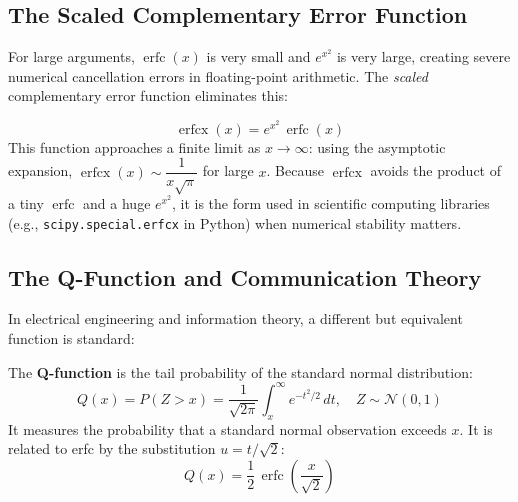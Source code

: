 \documentclass[11pt]{article}
\begin{document}
\subsection{The Scaled Complementary Error Function}

For large arguments, $\operatorname{erfc}(x)$ is very small and $e^{x^2}$ is very large, creating severe numerical cancellation errors in floating-point arithmetic. The \textit{scaled} complementary error function eliminates this:

\begin{defnbox}
\[
\operatorname{erfcx}(x) = e^{x^2}\,\operatorname{erfc}(x)
\]
This function approaches a finite limit as $x \to \infty$: using the asymptotic expansion,
$\operatorname{erfcx}(x) \sim \dfrac{1}{x\sqrt{\pi}}$ for large $x$.
Because $\operatorname{erfcx}$ avoids the product of a tiny $\operatorname{erfc}$ and a huge $e^{x^2}$, it is the form used in scientific computing libraries (e.g., \texttt{scipy.special.erfcx} in Python) when numerical stability matters.
\end{defnbox}

\subsection{The Q-Function and Communication Theory}

In electrical engineering and information theory, a different but equivalent function is standard:

\begin{defnbox}
The \textbf{Q-function} is the tail probability of the standard normal distribution:
\[
Q(x) = P(Z > x) = \frac{1}{\sqrt{2\pi}}\int_{x}^{\infty} e^{-t^2/2}\,dt, \quad Z \sim \mathcal{N}(0,1)
\]
It measures the probability that a standard normal observation exceeds $x$. It is related to erfc by the substitution $u = t/\sqrt{2}$:
\[
Q(x) = \frac{1}{2}\,\operatorname{erfc}\!\left(\frac{x}{\sqrt{2}}\right)
\]
\end{defnbox}
\end{document}
